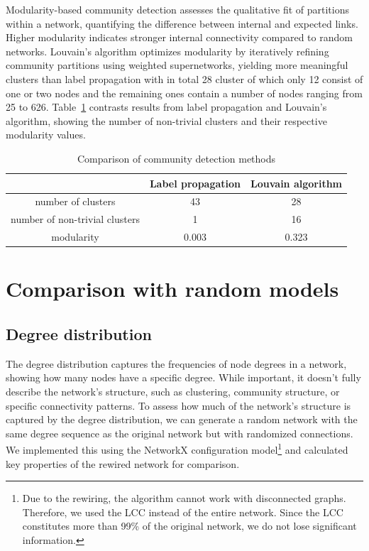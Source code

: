 \documentclass[paper=a4,fontsize=11pt,DIV=8,BCOR=5mm,oneside,pdftex,bibtotocnumbered]{scrreprt}
\theoremstyle{plain}
\begin{document}
	Modularity-based community detection assesses the qualitative fit of partitions within a network, quantifying the difference between internal and expected links. Higher modularity indicates stronger internal connectivity compared to random networks. Louvain's algorithm optimizes modularity by iteratively refining community partitions using weighted supernetworks, yielding more meaningful clusters than label propagation with in total 28 cluster of which only 12 consist of one or two nodes and the remaining ones contain a number of nodes ranging from 25 to 626. Table~\ref{tab:comm_comp} contrasts results from label propagation and Louvain's algorithm, showing the number of non-trivial clusters and their respective modularity values. 
	
	\begin{table}
		\caption{Comparison of community detection methods}
		\centering
		\begin{tabular}{|c||c|c|}
			\hline
			& Label propagation & Louvain algorithm \\
			\hline
			number of clusters & 43 & 28 \\
			number of non-trivial clusters & 1 & 16 \\
			modularity & 0.003 & 0.323 \\
			\hline
		\end{tabular}
		
		\label{tab:comm_comp}
	\end{table}
	
	\chapter{Comparison with random models}\label{ch:comp}
	\section{Degree distribution}
	The degree distribution captures the frequencies of node degrees in a network, showing how many nodes have a specific degree. While important, it doesn't fully describe the network's structure, such as clustering, community structure, or specific connectivity patterns. To assess how much of the network's structure is captured by the degree distribution, we can generate a random network with the same degree sequence as the original network but with randomized connections. We implemented this using the NetworkX configuration model\footnote{Due to the rewiring, the algorithm cannot work with disconnected graphs. Therefore, we used the LCC instead of the entire network. Since the LCC constitutes more than 99\% of the original network, we do not lose significant information.} and calculated key properties of the rewired network for comparison.
	
\end{document}
